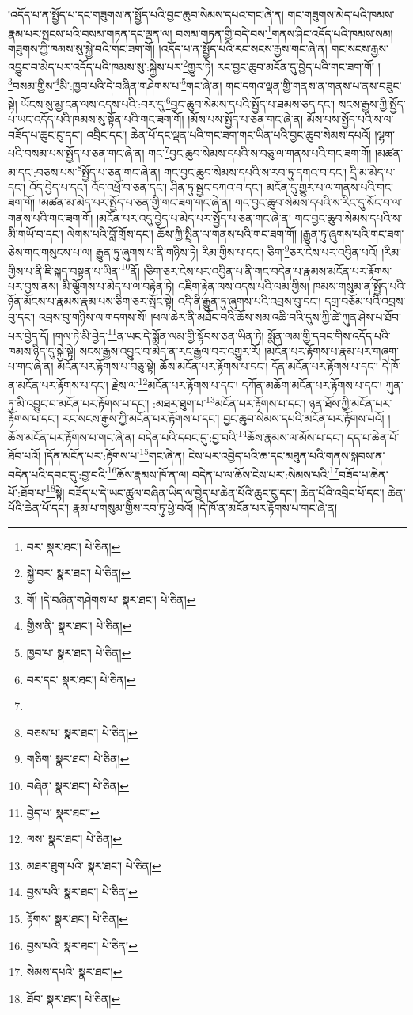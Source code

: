 །འདོད་པ་ན་སྤྱོད་པ་དང་གཟུགས་ན་སྤྱོད་པའི་བྱང་ཆུབ་སེམས་དཔའ་གང་ཞེ་ན། གང་གཟུགས་མེད་པའི་ཁམས་རྣམ་པར་སྤངས་པའི་བསམ་གཏན་དང་ལྡན་ལ། བསམ་གཏན་གྱི་བདེ་བས་\footnote{བར་  སྣར་ཐང་།  པེ་ཅིན། }གནས་ཤིང་འདོད་པའི་ཁམས་སམ། གཟུགས་ཀྱི་ཁམས་སུ་སྐྱེ་བའི་གང་ཟག་གོ། །འདོད་པ་ན་སྤྱོད་པའི་རང་སངས་རྒྱས་གང་ཞེ་ན། གང་སངས་རྒྱས་འབྱུང་བ་མེད་པར་འདོད་པའི་ཁམས་སུ་:སྐྱེས་པར་\footnote{སྐྱེ་བར་  སྣར་ཐང་།  པེ་ཅིན། }གྱུར་ཏེ། རང་བྱང་ཆུབ་མངོན་དུ་བྱེད་པའི་གང་ཟག་གོ། །\footnote{གོ། །དེ་བཞིན་གཤེགས་པ་  སྣར་ཐང་།  པེ་ཅིན། }བསམ་གྱིས་\footnote{གྱིས་ནི་  སྣར་ཐང་།  པེ་ཅིན། }མི་:ཁྱབ་པའི་དེ་བཞིན་གཤེགས་པ་\footnote{ཁྱབ་པ་  སྣར་ཐང་།  པེ་ཅིན། }གང་ཞེ་ན། གང་དགའ་ལྡན་གྱི་གནས་ན་གནས་པ་ནས་བཟུང་སྟེ། ཡོངས་སུ་མྱ་ངན་ལས་འདས་པའི་:བར་དུ་\footnote{བར་དང་  སྣར་ཐང་།  པེ་ཅིན། }བྱང་ཆུབ་སེམས་དཔའི་སྤྱོད་པ་ཐམས་ཅད་དང་། སངས་རྒྱས་ཀྱི་སྤྱོད་པ་ཡང་འདོད་པའི་ཁམས་སུ་སྟོན་པའི་གང་ཟག་གོ། །མོས་པས་སྤྱོད་པ་ཅན་གང་ཞེ་ན། མོས་པས་སྤྱོད་པའི་ས་ལ་བཟོད་པ་ཆུང་ངུ་དང་། འབྲིང་དང་། ཆེན་པོ་དང་ལྡན་པའི་གང་ཟག་གང་ཡིན་པའི་བྱང་ཆུབ་སེམས་དཔའོ། །ལྷག་པའི་བསམ་པས་སྤྱོད་པ་ཅན་གང་ཞེ་ན། གང་\footnote{}བྱང་ཆུབ་སེམས་དཔའི་ས་བཅུ་ལ་གནས་པའི་གང་ཟག་གོ། །མཚན་མ་དང་:བཅས་པས་\footnote{བཅས་པ་  སྣར་ཐང་།  པེ་ཅིན། }སྤྱོད་པ་ཅན་གང་ཞེ་ན། གང་བྱང་ཆུབ་སེམས་དཔའི་ས་རབ་ཏུ་དགའ་བ་དང་། དྲི་མ་མེད་པ་དང་། འོད་བྱེད་པ་དང་། འོད་འཕྲོ་བ་ཅན་དང་། ཤིན་ཏུ་སྦྱང་དཀའ་བ་དང་། མངོན་དུ་གྱུར་པ་ལ་གནས་པའི་གང་ཟག་གོ། །མཚན་མ་མེད་པར་སྤྱོད་པ་ཅན་གྱི་གང་ཟག་གང་ཞེ་ན། གང་བྱང་ཆུབ་སེམས་དཔའི་ས་རིང་དུ་སོང་བ་ལ་གནས་པའི་གང་ཟག་གོ། །མངོན་པར་འདུ་བྱེད་པ་མེད་པར་སྤྱོད་པ་ཅན་གང་ཞེ་ན། གང་བྱང་ཆུབ་སེམས་དཔའི་ས་མི་གཡོ་བ་དང་། ལེགས་པའི་བློ་གྲོས་དང་། ཆོས་ཀྱི་སྤྲིན་ལ་གནས་པའི་གང་ཟག་གོ། །རྒྱུན་ཏུ་ཞུགས་པའི་གང་ཟག་ཅེས་གང་གསུངས་པ་ལ། རྒྱུན་ཏུ་ཞུགས་པ་ནི་གཉིས་ཏེ། རིམ་གྱིས་པ་དང་། ཅིག་\footnote{གཅིག་  སྣར་ཐང་།  པེ་ཅིན། }ཅར་ངེས་པར་འབྱིན་པའོ། །རིམ་གྱིས་པ་ནི་ཇི་སྐད་བསྟན་པ་ཡིན་\footnote{བཞིན་  སྣར་ཐང་།  པེ་ཅིན། }ནོ། །ཅིག་ཅར་ངེས་པར་འབྱིན་པ་ནི་གང་བདེན་པ་རྣམས་མངོན་པར་རྟོགས་པར་བྱས་ནས། མི་ལྕོགས་པ་མེད་པ་ལ་བརྟེན་ཏེ། འཇིག་རྟེན་ལས་འདས་པའི་ལམ་གྱིས། ཁམས་གསུམ་ན་སྤྱོད་པའི་ཉོན་མོངས་པ་རྣམས་རྣམ་པས་ཅིག་ཅར་སྤོང་སྟེ། འདི་ནི་རྒྱུན་ཏུ་ཞུགས་པའི་འབྲས་བུ་དང་། དགྲ་བཅོམ་པའི་འབྲས་བུ་དང་། འབྲས་བུ་གཉིས་ལ་གདགས་སོ། །ཕལ་ཆེར་ནི་མཐོང་བའི་ཆོས་སམ་འཆི་བའི་དུས་ཀྱི་ཚེ་ཀུན་ཤེས་པ་ཐོབ་པར་བྱེད་དོ། །གལ་ཏེ་མི་བྱེད་\footnote{བྱེད་པ་  སྣར་ཐང་། }ན་ཡང་དེ་སྨོན་ལམ་གྱི་སྟོབས་ཅན་ཡིན་ཏེ། སྨོན་ལམ་གྱི་དབང་གིས་འདོད་པའི་ཁམས་ཉིད་དུ་སྐྱེ་སྟེ། སངས་རྒྱས་འབྱུང་བ་མེད་ན་རང་རྒྱལ་བར་འགྱུར་རོ། །མངོན་པར་རྟོགས་པ་རྣམ་པར་གཞག་པ་གང་ཞེ་ན། མངོན་པར་རྟོགས་པ་བཅུ་སྟེ། ཆོས་མངོན་པར་རྟོགས་པ་དང་། དོན་མངོན་པར་རྟོགས་པ་དང་། དེ་ཁོ་ན་མངོན་པར་རྟོགས་པ་དང་། རྗེས་ལ་\footnote{ལས་  སྣར་ཐང་།  པེ་ཅིན། }མངོན་པར་རྟོགས་པ་དང་། དཀོན་མཆོག་མངོན་པར་རྟོགས་པ་དང་། ཀུན་ཏུ་མི་འབྱུང་བ་མངོན་པར་རྟོགས་པ་དང་། :མཐར་ཐུག་པ་\footnote{མཐར་ཐུག་པའི་  སྣར་ཐང་།  པེ་ཅིན། }མངོན་པར་རྟོགས་པ་དང་། ཉན་ཐོས་ཀྱི་མངོན་པར་རྟོགས་པ་དང་། རང་སངས་རྒྱས་ཀྱི་མངོན་པར་རྟོགས་པ་དང་། བྱང་ཆུབ་སེམས་དཔའི་མངོན་པར་རྟོགས་པའོ། །ཆོས་མངོན་པར་རྟོགས་པ་གང་ཞེ་ན། བདེན་པའི་དབང་དུ་:བྱ་བའི་\footnote{བྱས་པའི་  སྣར་ཐང་།  པེ་ཅིན། }ཆོས་རྣམས་ལ་མོས་པ་དང་། དད་པ་ཆེན་པོ་ཐོབ་པའོ། །དོན་མངོན་པར་:རྟོགས་པ་\footnote{རྟོགས་  སྣར་ཐང་།  པེ་ཅིན། }གང་ཞེ་ན། ངེས་པར་འབྱེད་པའི་ཆ་དང་མཐུན་པའི་གནས་སྐབས་ན་བདེན་པའི་དབང་དུ་:བྱ་བའི་\footnote{བྱས་པའི་  སྣར་ཐང་།  པེ་ཅིན། }ཆོས་རྣམས་ཁོ་ན་ལ། བདེན་པ་ལ་ཆོས་ངེས་པར་:སེམས་པའི་\footnote{སེམས་དཔའི་  སྣར་ཐང་། }བཟོད་པ་ཆེན་པོ་:ཐོབ་པ་\footnote{ཐོབ་  སྣར་ཐང་།  པེ་ཅིན། }སྟེ། བཟོད་པ་དེ་ཡང་ཚུལ་བཞིན་ཡིད་ལ་བྱེད་པ་ཆེན་པོའི་ཆུང་ངུ་དང་། ཆེན་པོའི་འབྲིང་པོ་དང་། ཆེན་པོའི་ཆེན་པོ་དང་། རྣམ་པ་གསུམ་གྱིས་རབ་ཏུ་ཕྱེ་བའོ། །དེ་ཁོ་ན་མངོན་པར་རྟོགས་པ་གང་ཞེ་ན། 